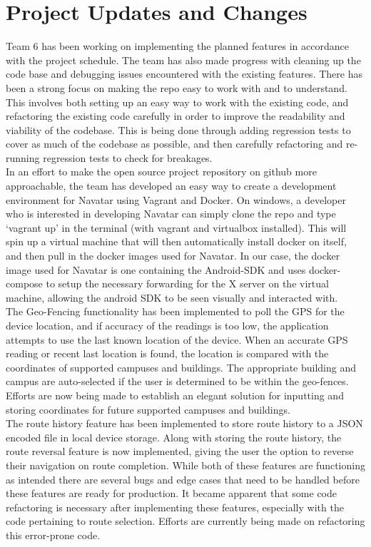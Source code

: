 \documentclass{scrreprt}
\begin{document}
\chapter{Project Updates and Changes}
Team 6 has been working on implementing the planned features in accordance with the project schedule. The team has also made progress with cleaning up the code base and debugging issues encountered with the existing features. There has been a strong focus on making the repo easy to work with and to understand. This involves both setting up an easy way to work with the existing code, and refactoring the existing code carefully in order to improve the readability and viability of the codebase. This is being done through adding regression tests to cover as much of the codebase as possible, and then carefully refactoring and re-running regression tests to check for breakages.\\

In an effort to make the open source project repository on github more approachable, the team has developed an easy way to create a development environment for Navatar using Vagrant and Docker. On windows, a developer who is interested in developing Navatar can simply clone the repo and type ‘vagrant up’ in the terminal (with vagrant and virtualbox installed). This will spin up a virtual machine that will then automatically install docker on itself, and then pull in the docker images used for Navatar. In our case, the docker image used for Navatar is one containing the Android-SDK and uses docker-compose to setup the necessary forwarding for the X server on the virtual machine, allowing the android SDK to be seen visually and interacted with.\\

    The Geo-Fencing functionality has been implemented to poll the GPS for the device location, and if accuracy of the readings is too low, the application attempts to use the last known location of the device. When an accurate GPS reading or recent last location is found, the location is compared with the coordinates of supported campuses and buildings. The appropriate building and campus are auto-selected if the user is determined to be within the geo-fences. Efforts are now being made to establish an elegant solution for inputting and storing coordinates for future supported campuses and buildings.\\
    
The route history feature has been implemented to store route history to a JSON encoded file in local device storage. Along with storing the route history, the route reversal feature is now implemented, giving the user the option to reverse their navigation on route completion. While both of these features are functioning as intended there are several bugs and edge cases that need to be handled before these features are ready for production. It became apparent that some code refactoring is necessary after implementing these features, especially with the code pertaining to route selection. Efforts are currently being made on refactoring this error-prone code.\\
\end{document}
